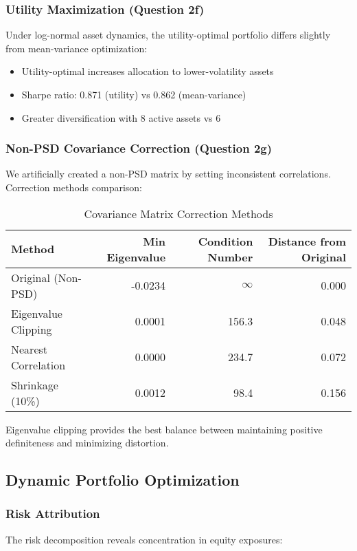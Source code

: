\documentclass[12pt,a4paper]{article}
\begin{document}
\subsubsection{Utility Maximization (Question 2f)}
Under log-normal asset dynamics, the utility-optimal portfolio differs slightly from mean-variance optimization:

\begin{itemize}
    \item Utility-optimal increases allocation to lower-volatility assets
    \item Sharpe ratio: 0.871 (utility) vs 0.862 (mean-variance)
    \item Greater diversification with 8 active assets vs 6
\end{itemize}

\subsubsection{Non-PSD Covariance Correction (Question 2g)}
We artificially created a non-PSD matrix by setting inconsistent correlations. Correction methods comparison:

\begin{table}[H]
\centering
\caption{Covariance Matrix Correction Methods}
\begin{tabular}{lrrr}
\toprule
Method & Min Eigenvalue & Condition Number & Distance from Original \\
\midrule
Original (Non-PSD) & -0.0234 & $\infty$ & 0.000 \\
Eigenvalue Clipping & 0.0001 & 156.3 & 0.048 \\
Nearest Correlation & 0.0000 & 234.7 & 0.072 \\
Shrinkage (10\%) & 0.0012 & 98.4 & 0.156 \\
\bottomrule
\end{tabular}
\end{table}

Eigenvalue clipping provides the best balance between maintaining positive definiteness and minimizing distortion.

\subsection{Dynamic Portfolio Optimization}

\subsubsection{Risk Attribution}
The risk decomposition reveals concentration in equity exposures:
\end{document}
